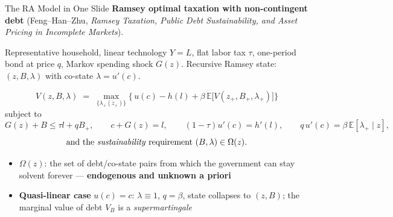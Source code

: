 \documentclass[10pt,aspectratio=169]{beamer}
\begin{document}
\begin{frame}{The RA Model in One Slide}
\textbf{Ramsey optimal taxation with non-contingent debt} (Feng--Han--Zhu, \emph{Ramsey Taxation, Public Debt Sustainability, and Asset Pricing in Incomplete Markets}).

\smallskip
Representative household, linear technology $Y=L$, flat labor tax $\tau$, one-period bond at price $q$, Markov spending shock $G(z)$. Recursive Ramsey state: $(z, B, \lambda)$ with co-state $\lambda = u'(c)$.

\vspace{-0.1cm}
\[
V(z,B,\lambda) \;=\; \max_{\{\lambda_+(z_+)\}} \Big\{\, u(c) - h(l) + \beta\,\mathbb{E}\big[V(z_+, B_+, \lambda_+)\big] \Big\}
\]
subject to
\[
G(z)+B \le \tau l + q B_+, \qquad c + G(z) = l, \qquad (1-\tau)u'(c)=h'(l), \qquad q\,u'(c)=\beta\,\mathbb{E}[\lambda_+ \mid z],
\]
\[
\text{and the \emph{sustainability} requirement } (B,\lambda) \in \Omega(z).
\]

\smallskip
\begin{itemize}
    \item $\Omega(z)$: the set of debt/co-state pairs from which the government can stay solvent
          forever --- \textbf{endogenous and unknown a priori}
    \item \textbf{Quasi-linear case} $u(c)=c$: $\lambda \equiv 1$, $q=\beta$, state collapses to $(z,B)$;
          the marginal value of debt $V_B$ is a \emph{supermartingale}
\end{itemize}
\end{frame}
\end{document}
